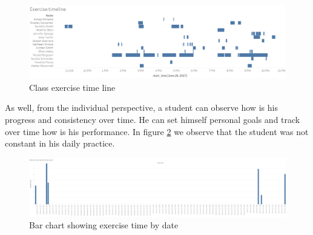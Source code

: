 \begin{figure}[!h]
	\centering
	\includegraphics[width=1\linewidth]{gfx/Exercise_timeline}
	\caption{Class exercise time line}
	\label{fig:Exercise_timeline}
\end{figure}

As well, from the individual perspective, a student can observe how is his progress and consistency over time. He can set himself personal goals and track over time how is his performance. In figure \ref{fig:Session_durations_by_user} we observe that the student was not constant in his daily practice.

\begin{figure}[!h]
	\centering
	\includegraphics[width=1\linewidth]{gfx/Session_durations_by_user}
	\caption{Bar chart showing exercise time by date}
	\label{fig:Session_durations_by_user}
\end{figure}

